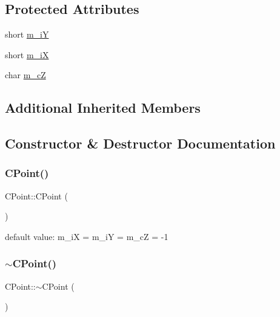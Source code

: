 \subsection*{Protected Attributes}
\begin{DoxyCompactItemize}
\item 
short \mbox{\hyperlink{classCPoint_a9b44115b3f3268f92c695e58bf8f910d}{m\+\_\+iY}}
\item 
short \mbox{\hyperlink{classCPoint_ac9057a0b88c5ef9904b6b1e0f8f6ef33}{m\+\_\+iX}}
\item 
char \mbox{\hyperlink{classCPoint_af5bd6bd96c41a2f050fe2f5f2d6595de}{m\+\_\+cZ}}
\end{DoxyCompactItemize}
\subsection*{Additional Inherited Members}


\subsection{Constructor \& Destructor Documentation}
\mbox{\label{classCPoint_afce98ba89f4a9283c9d1c94571ca70f2}} 
\subsubsection{\texorpdfstring{CPoint()}{CPoint()}}
{\footnotesize\ttfamily C\+Point\+::\+C\+Point (\begin{DoxyParamCaption}{ }\end{DoxyParamCaption})}

default value\+: m\+\_\+iX = m\+\_\+iY = m\+\_\+cZ = -\/1 \mbox{\label{classCPoint_a1f368b093ec85c9ee8ec3da805aa1d47}} 
\subsubsection{\texorpdfstring{$\sim$CPoint()}{~CPoint()}}
{\footnotesize\ttfamily C\+Point\+::$\sim$\+C\+Point (\begin{DoxyParamCaption}{ }\end{DoxyParamCaption})\hspace{0.3cm}{\ttfamily [virtual]}}



